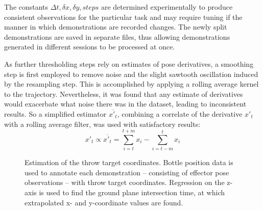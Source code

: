 \documentclass{article}
\begin{document}
The constants $\Delta t, \delta x, \delta y, steps$ are determined experimentally to produce consistent observations for the particular task and may require tuning if the manner in which demonstrations are recorded changes. The newly split demonstrations are saved in separate files, thus allowing demonstrations generated in different sessions to be processed at once.

As further thresholding steps rely on estimates of pose derivatives, a smoothing step is first employed to remove noise and the slight sawtooth oscillation induced by the resampling step. This is accomplished by applying a rolling average kernel to the trajectory. Nevertheless, it was found that any estimate of derivatives would exacerbate what noise there was in the dataset, leading to inconsistent results. So a simplified estimator $\overline{x'_t}$, combining a correlate of the derivative $x'_t$ with a rolling average filter, was used with satisfactory results:
\begin{equation}
    x'_t \propto \overline{x'_t} = \sum_{i=t}^{t+m}  x_i - \sum_{i=t-m}^{t}  x_i
\end{equation}


\begin{figure}
	\centering
	\caption{Estimation of the throw target coordinates. Bottle position data is used to annotate each demonstration -- consisting of effector pose observations -- with throw target coordinates. Regression on the z-axis is used to find the ground plane intersection time, at which extrapolated x- and y-coordinate values are found.}
	\label{fig:fig3}
\end{figure}
\end{document}
